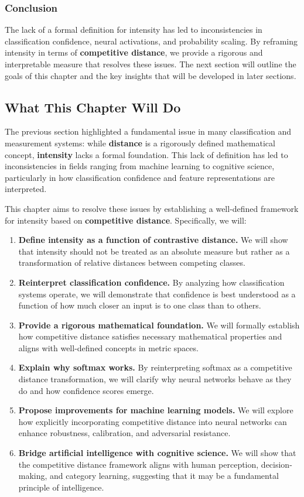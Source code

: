 \documentclass[12pt]{article}
\begin{document}
\subsubsection{Conclusion}

The lack of a formal definition for intensity has led to inconsistencies in classification confidence, neural activations, and probability scaling. By reframing intensity in terms of \textbf{competitive distance}, we provide a rigorous and interpretable measure that resolves these issues. The next section will outline the goals of this chapter and the key insights that will be developed in later sections.

\subsection{What This Chapter Will Do}

The previous section highlighted a fundamental issue in many classification and measurement systems: while \textbf{distance} is a rigorously defined mathematical concept, \textbf{intensity} lacks a formal foundation. This lack of definition has led to inconsistencies in fields ranging from machine learning to cognitive science, particularly in how classification confidence and feature representations are interpreted.

This chapter aims to resolve these issues by establishing a well-defined framework for intensity based on \textbf{competitive distance}. Specifically, we will:

\begin{enumerate}
    \item \textbf{Define intensity as a function of contrastive distance.} We will show that intensity should not be treated as an absolute measure but rather as a transformation of relative distances between competing classes.
    \item \textbf{Reinterpret classification confidence.} By analyzing how classification systems operate, we will demonstrate that confidence is best understood as a function of how much closer an input is to one class than to others.
    \item \textbf{Provide a rigorous mathematical foundation.} We will formally establish how competitive distance satisfies necessary mathematical properties and aligns with well-defined concepts in metric spaces.
    \item \textbf{Explain why softmax works.} By reinterpreting softmax as a competitive distance transformation, we will clarify why neural networks behave as they do and how confidence scores emerge.
    \item \textbf{Propose improvements for machine learning models.} We will explore how explicitly incorporating competitive distance into neural networks can enhance robustness, calibration, and adversarial resistance.
    \item \textbf{Bridge artificial intelligence with cognitive science.} We will show that the competitive distance framework aligns with human perception, decision-making, and category learning, suggesting that it may be a fundamental principle of intelligence.
\end{enumerate}
\end{document}
